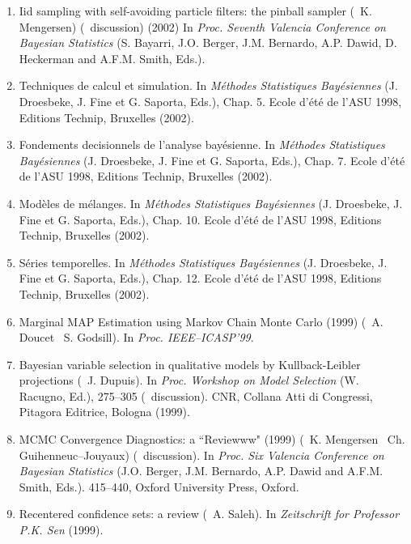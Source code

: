 \begin{enumerate}
\item Iid sampling with self-avoiding particle filters: the pinball sampler
(\avec\ K. Mengersen) (\avec\  discussion) (2002) 
In {\it  Proc. Seventh Valencia Conference on Bayesian Statistics}
(S. Bayarri, J.O. Berger, J.M. Bernardo, A.P. Dawid, D. Heckerman and A.F.M. Smith, Eds.).

\item Techniques de calcul et simulation. 
In {\it M\'ethodes Statistiques Bay\'esiennes} (J. Droesbeke, J. Fine
et G. Saporta, Eds.), Chap. 5. Ecole d'\'et\'e de l'ASU 1998, Editions Technip, Bruxelles (2002).

\item Fondements decisionnels de l'analyse bay\'esienne.
In {\it M\'ethodes Statistiques Bay\'esiennes} (J. Droesbeke, J. Fine
et G. Saporta, Eds.), Chap. 7. Ecole d'\'et\'e de l'ASU 1998, Editions Technip, Bruxelles (2002).

\item Mod\`eles de m\'elanges.  In {\it M\'ethodes Statistiques Bay\'esiennes} (J. Droesbeke, J. Fine
et G. Saporta, Eds.), Chap. 10. Ecole d'\'et\'e de l'ASU 1998, Editions Technip, Bruxelles (2002).

\item S\'eries temporelles. In {\it M\'ethodes Statistiques Bay\'esiennes} 
(J. Droesbeke, J. Fine et G. Saporta, Eds.), Chap. 12.
Ecole d'\'et\'e de l'ASU 1998, Editions Technip, Bruxelles (2002).

\item Marginal MAP Estimation using Markov Chain Monte Carlo (1999)
(\avec\  A. Doucet \et\ S. Godsill). In {\it  Proc. IEEE--ICASP'99}.

\item Bayesian variable selection in qualitative models
by Kullback-Leibler projections (\avec\ J. Dupuis). In
{\it Proc. Workshop on Model Selection} (W. Racugno, Ed.),
275--305 (\avec\ discussion). CNR, Collana Atti di Congressi,
Pitagora Editrice, Bologna (1999).

\item MCMC Convergence Diagnostics: a ``Reviewww" (1999)
(\avec\  K. Mengersen \et\ Ch. Guihenneuc--Jou\-y\-aux)
(\avec\  discussion). 
In {\it  Proc. Six Valencia Conference on Bayesian Statistics}
(J.O. Berger, J.M. Bernardo, A.P. Dawid and A.F.M. Smith, Eds.). 
415--440, Oxford University Press, Oxford. 

\item Recentered confidence sets: a review
(\avec\  A. Saleh).  In {\it Zeitschrift for Professor P.K. Sen} (1999).


\end{enumerate}

